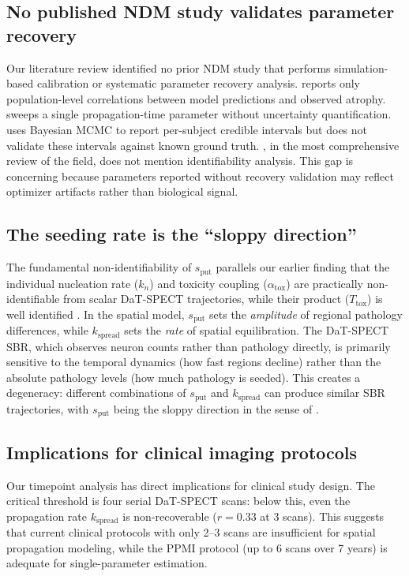 \subsection{No published NDM study validates parameter recovery}

Our literature review identified no prior NDM study that performs simulation-based calibration or systematic parameter recovery analysis. \cite{raj2012} reports only population-level correlations between model predictions and observed atrophy. \cite{pandya2019} sweeps a single propagation-time parameter without uncertainty quantification. \cite{schafer2021} uses Bayesian MCMC to report per-subject credible intervals but does not validate these intervals against known ground truth. \cite{vogel2023}, in the most comprehensive review of the field, does not mention identifiability analysis. This gap is concerning because parameters reported without recovery validation may reflect optimizer artifacts rather than biological signal.

\subsection{The seeding rate is the ``sloppy direction''}

The fundamental non-identifiability of $s_{\text{put}}$ parallels our earlier finding that the individual nucleation rate ($k_n$) and toxicity coupling ($\alpha_{\text{tox}}$) are practically non-identifiable from scalar DaT-SPECT trajectories, while their product ($T_{\text{tox}}$) is well identified \cite{dupre2026phase2}. In the spatial model, $s_{\text{put}}$ sets the \textit{amplitude} of regional pathology differences, while $k_{\text{spread}}$ sets the \textit{rate} of spatial equilibration. The DaT-SPECT SBR, which observes neuron counts rather than pathology directly, is primarily sensitive to the temporal dynamics (how fast regions decline) rather than the absolute pathology levels (how much pathology is seeded). This creates a degeneracy: different combinations of $s_{\text{put}}$ and $k_{\text{spread}}$ can produce similar SBR trajectories, with $s_{\text{put}}$ being the sloppy direction in the sense of \cite{gutenkunst2007}.

\subsection{Implications for clinical imaging protocols}

Our timepoint analysis has direct implications for clinical study design. The critical threshold is four serial DaT-SPECT scans: below this, even the propagation rate $k_{\text{spread}}$ is non-recoverable ($r = 0.33$ at 3 scans). This suggests that current clinical protocols with only 2--3 scans are insufficient for spatial propagation modeling, while the PPMI protocol (up to 6 scans over 7 years) is adequate for single-parameter estimation.


